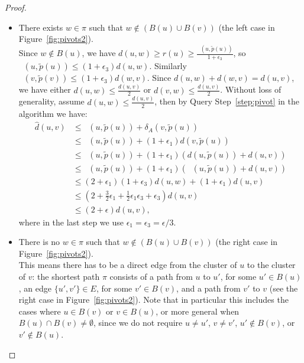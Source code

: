\documentclass[11pt]{article}
\theoremstyle{definition}
\theoremstyle{remark}
\DeclareMathOperator{\dLNbunch}{\delta_{\tilde{B}}}
\begin{document}
\begin{titlepage}
\begin{proof}
    \begin{itemize}
        \item[Case 1:] There exists $w\in \pi$ such that $w\notin (B(u)\cup B(v))$ (the left case in Figure~\ref{fig:pivots2}).\\
        Since $w\notin B(u)$, we have $d(u,w)\geq   r(u) \geq \tfrac{\dLNbunch(u,\tilde p(u))}{1+\epsilon_3}$, so $\dLNbunch(u,\tilde p(u))\leq (1+\epsilon_3)d(u,w)$. 
        Similarly $\dLNbunch(v,\tilde p(v)) \leq (1+\epsilon_3)d(w,v)$. Since $d(u,w)+d(w,v)=d(u,v)$, we have either
        $d(u,w)\leq \tfrac{d(u,v)}{2}$ or $d(v,w)\leq \tfrac{d(u,v)}{2}$. 
        Without loss of generality, assume $d(u,w) \leq \tfrac{d(u,v)}{2}$, then by Query Step~\ref{step:pivot} in the algorithm we have:
        \begin{align*} 
        \hat{d}(u,v) &\leq \dLNbunch(u,\tilde p(u))+\delta_A(v,\tilde p(u)) \\
        &\leq \dLNbunch(u,\tilde p(u)) +(1+\epsilon_1)d(v,\tilde p(u))\\
        &\leq \dLNbunch(u,\tilde p(u))+(1+\epsilon_1)(d(u,\tilde p(u))+d(u,v))\\
        &\leq \dLNbunch(u,\tilde p(u))+(1+\epsilon_1)(\dLNbunch(u,\tilde p(u))+d(u,v))\\
        &\leq  (2+\epsilon_1)(1+\epsilon_3)d(u,w)+(1+\epsilon_1)d(u,v)\\
        &\leq (2+\tfrac{3}{2}\epsilon_1+\tfrac{1}{2}\epsilon_1\epsilon_3+\epsilon_3)d(u,v)\\
        &\leq (2+\epsilon)d(u,v),
        \end{align*}
        where in the last step we use $\epsilon_1=\epsilon_3=\epsilon/3$.
        \item[Case 2:] 
        There is no $w\in \pi$ such that $w\notin (B(u)\cup B(v))$ (the right case in Figure~\ref{fig:pivots2}).
        \\ 
        This means there has to be a direct edge from the cluster of $u$ to the cluster of $v$: the shortest path $\pi$ consists of a path from $u$ to $u'$, for some $u'\in B(u)$, an edge $\{u',v'\}\in E$, for some $v'\in B(v)$, and a path from $v'$ to $v$ (see the right case in Figure~\ref{fig:pivots2}). Note that in particular this includes the cases where $u\in B(v)$ or $v\in B(u)$, or more general when $B(u)\cap B(v)\neq \emptyset$, since we do not require $u\neq u'$, $v\neq v'$, $u'\notin B(v)$, or $v'\notin B(u)$.\\

\end{itemize}
\end{proof}
\end{titlepage}
\end{document}
